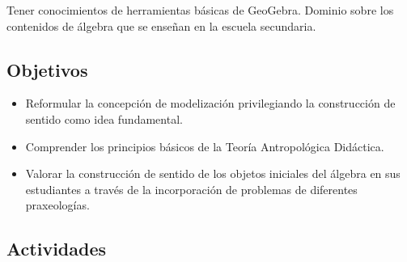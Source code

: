 Tener conocimientos de herramientas básicas de GeoGebra. Dominio sobre los
contenidos de álgebra que se enseñan en la escuela secundaria.

\subsection{Objetivos}

\begin{itemize}
	\item Reformular la concepción de modelización privilegiando la construcción de 	sentido como idea fundamental.
	\item Comprender los principios básicos de la Teoría Antropológica Didáctica.
	\item Valorar la construcción de sentido de los objetos iniciales del álgebra en sus estudiantes a través de la incorporación de problemas de diferentes praxeologías.
\end{itemize}

\subsection{Actividades}

